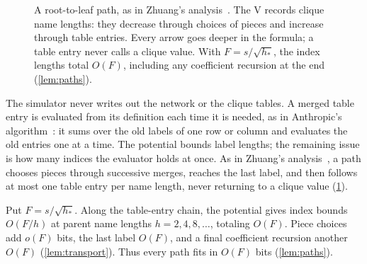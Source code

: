 \documentclass[11pt]{article}
\theoremstyle{definition}
\theoremstyle{definition}
\theoremstyle{remark}
\begin{document}
\begin{figure}[!t]
\centering
{}
\caption{A root-to-leaf path, as in Zhuang's analysis~\cite[\S5]{Zhu26}. The V records clique name lengths: they decrease through choices of pieces and increase through table entries. Every arrow goes deeper in the formula; a table entry never calls a clique value. With $F=s/\sqrt{h_*}$, the index lengths total $O(F)$, including any coefficient recursion at the end (\cref{lem:paths}).}
\label{fig:path}
\end{figure}

The simulator never writes out the network or the clique tables. A merged table entry is evaluated from its definition each time it is needed, as in Anthropic's algorithm~\cite[Algorithm~1]{Ant26}: it sums over the old labels of one row or column and evaluates the old entries one at a time. The potential bounds label lengths; the remaining issue is how many indices the evaluator holds at once. As in Zhuang's analysis~\cite[\S5]{Zhu26}, a path chooses pieces through successive merges, reaches the last label, and then follows at most one table entry per name length, never returning to a clique value (\cref{fig:path}).

Put $F=s/\sqrt{h_*}$. Along the table-entry chain, the potential gives index bounds $O(F/h)$ at parent name lengths $h=2,4,8,\dots$, totaling $O(F)$. Piece choices add $o(F)$ bits, the last label $O(F)$, and a final coefficient recursion another $O(F)$ (\cref{lem:transport}). Thus every path fits in $O(F)$ bits (\cref{lem:paths}).
\end{document}

